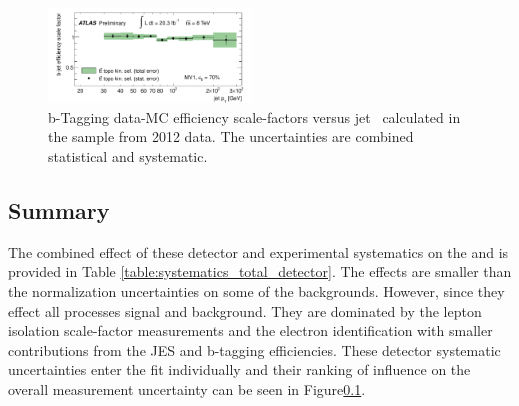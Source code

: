 \begin{figure}[htbp]
\begin{center}
\includegraphics[width=0.48\textwidth]{figs/systematics/ttbartopo}
\caption{b-Tagging data-MC efficiency scale-factors versus jet \pt\ calculated in the \ttbar sample from 2012 data. The uncertainties are combined statistical and systematic.} 
\label{figure:systematics_b}
\end{center}
\end{figure}


\subsection{Summary}

The combined effect of these detector and experimental systematics on the \ttV and \tth is provided in Table \ref{table:systematics_total_detector}. The effects are smaller than the normalization uncertainties on some of the backgrounds. However, since they effect all processes signal and background. They are dominated by the lepton isolation scale-factor measurements and the electron identification with smaller contributions from the JES and b-tagging efficiencies. These detector systematic uncertainties enter the fit individually and their ranking of influence on the overall measurement uncertainty can be seen in Figure\ref{}.

